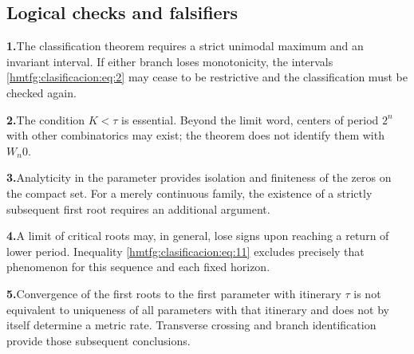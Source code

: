 \subsection{Logical checks and falsifiers}
\label{hmtfg:clasificacion:7}

\par\noindent\textbf{1.}\enspace The classification theorem requires a strict unimodal maximum and an invariant interval. If either branch loses monotonicity, the intervals \eqref{hmtfg:clasificacion:eq:2} may cease to be restrictive and the classification must be checked again.
\par\noindent\textbf{2.}\enspace The condition \(K<\tau\) is essential. Beyond the limit word, centers of period \(2^n\) with other combinatorics may exist; the theorem does not identify them with \(W_n0\).
\par\noindent\textbf{3.}\enspace Analyticity in the parameter provides isolation and finiteness of the zeros on the compact set. For a merely continuous family, the existence of a strictly subsequent first root requires an additional argument.
\par\noindent\textbf{4.}\enspace A limit of critical roots may, in general, lose signs upon reaching a return of lower period. Inequality \eqref{hmtfg:clasificacion:eq:11} excludes precisely that phenomenon for this sequence and each fixed horizon.
\par\noindent\textbf{5.}\enspace Convergence of the first roots to the first parameter with itinerary \(\tau\) is not equivalent to uniqueness of all parameters with that itinerary and does not by itself determine a metric rate. Transverse crossing and branch identification provide those subsequent conclusions.
